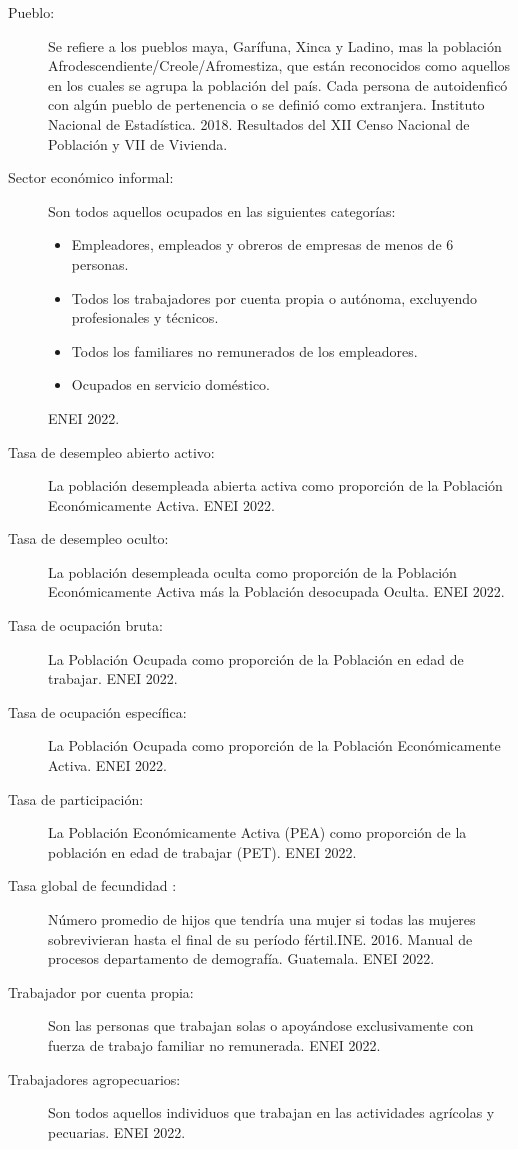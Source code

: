 \begin{description}
	\item[Pueblo:] Se refiere a los pueblos maya, Garífuna, Xinca y Ladino, mas la población Afrodescendiente/Creole/Afromestiza, que están reconocidos como aquellos en los cuales se agrupa la población del país. Cada persona de autoidenficó con algún pueblo de pertenencia o se definió como extranjera. Instituto Nacional de Estadística. 2018. Resultados del XII Censo Nacional de Población y VII de Vivienda.
	\item[Sector económico informal:] Son todos aquellos ocupados en las siguientes categorías:
	\begin{itemize}\itemsep -1pt
		\item	Empleadores, empleados y obreros de empresas de menos de 6 personas.
		\item	Todos los trabajadores por cuenta propia o autónoma, excluyendo profesionales y técnicos. 
		\item	Todos los familiares no remunerados de los empleadores.
		\item	Ocupados en servicio doméstico.
	\end{itemize}
	ENEI 2022.
	\item[Tasa de desempleo abierto activo:] La población desempleada abierta activa como proporción de la Población Económicamente Activa. ENEI 2022.
	\item[Tasa de desempleo oculto:] La población desempleada oculta como proporción de la Población Económicamente Activa más la Población desocupada Oculta. ENEI 2022.
	\item[Tasa de ocupación bruta:] La Población Ocupada como proporción de la Población en edad de trabajar. ENEI 2022.
	\item[Tasa de ocupación específica:] La Población Ocupada como proporción de la Población Económicamente Activa. ENEI 2022.
	\item[Tasa de participación:] La Población Económicamente Activa (PEA) como proporción de la población en edad de trabajar (PET). ENEI 2022.
	\item[Tasa global de fecundidad :] Número promedio de hijos que tendría una mujer si todas las mujeres sobrevivieran hasta el final de su período fértil.INE. 2016. Manual de procesos departamento de demografía. Guatemala. ENEI 2022.
	\item[Trabajador por cuenta propia:] Son las personas que trabajan solas o apoyándose exclusivamente con fuerza de trabajo familiar no remunerada. ENEI 2022.
	\item[Trabajadores agropecuarios:] Son todos aquellos individuos que trabajan en las actividades agrícolas y pecuarias. ENEI 2022.

\end{description}
